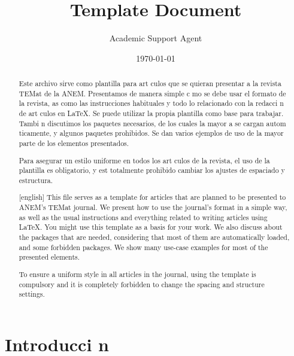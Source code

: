 \documentclass{article}
\title{Template Document}
\author{Academic Support Agent}
\date{\today}
\begin{document}
\maketitle

\begin{abstract}
Este archivo sirve como plantilla para art culos que se quieran presentar a la revista TEMat de la ANEM.
Presentamos de manera simple c mo se debe usar el formato de la revista, as  como las instrucciones habituales y todo lo relacionado con la redacci n de art culos en \LaTeX.
Se puede utilizar la propia plantilla como base para trabajar.
Tambi n discutimos los paquetes necesarios, de los cuales la mayor a se cargan autom ticamente, y algunos paquetes prohibidos.
Se dan varios ejemplos de uso de la mayor parte de los elementos presentados.

Para asegurar un estilo uniforme en todos los art culos de la revista, el uso de la plantilla es obligatorio, y est  totalmente prohibido cambiar los ajustes de espaciado y estructura.
\end{abstract}
\begin{abstract}[english]
This file serves as a template for articles that are planned to be presented to ANEM's TEMat journal.
We present how to use the journal's format in a simple way, as well as the usual instructions and everything related to writing articles using \LaTeX.
You might use this template as a basis for your work.
We also discuss about the packages that are needed, considering that most of them are automatically loaded, and some forbidden packages.
We show many use-case examples for most of the presented elements.

To ensure a uniform style in all articles in the journal, using the template is compulsory and it is completely forbidden to change the spacing and structure settings.
\end{abstract}
\maketitle

\section{Introducci n}
\end{document}
